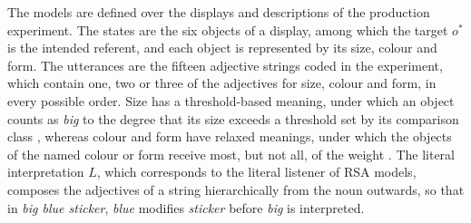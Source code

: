 \documentclass[10pt,a4paper,fleqn]{article}
\begin{document}
The models are defined over the displays and descriptions of the production experiment.
The states are the six objects of a display, among which the target $o^*$ is the intended referent, and each object is represented by its size, colour and form.
The utterances are the fifteen adjective strings coded in the experiment, which contain one, two or three of the adjectives for size, colour and form, in every possible order.
Size has a threshold-based meaning, under which an object counts as \emph{big} to the degree that its size exceeds a threshold set by its comparison class \citep{schmidt2009how,franke2019subjectivity}, whereas colour and form have relaxed meanings, under which the objects of the named colour or form receive most, but not all, of the weight \citep{degen2020redundancy}.
The literal interpretation $L$, which corresponds to the literal listener of RSA models, composes the adjectives of a string hierarchically from the noun outwards, so that in \emph{big blue sticker}, \emph{blue} modifies \emph{sticker} before \emph{big} is interpreted.
\end{document}
